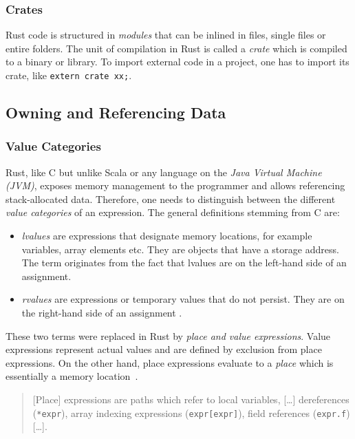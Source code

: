 \subsubsection{Crates}

Rust code is structured in \emph{modules} that can be inlined in files, single
files or entire folders. The unit of compilation in Rust is called a
\emph{crate} which is compiled to a binary or library. To import external code
in a project, one has to import its crate, like \lstinline!extern crate xx;!.

\subsection{Owning and Referencing Data}

\subsubsection{Value Categories}

Rust, like C but unlike Scala or any language on the \emph{Java Virtual Machine
(JVM)}, exposes memory management to the programmer and allows referencing
stack-allocated data. Therefore, one needs to distinguish between the different
\emph{value categories} of an expression. The general definitions stemming from
C are:

\begin{itemize}
\tightlist
\item
  \emph{lvalues} are expressions that designate memory locations, for
  example variables, array elements etc. They are objects that have a
  storage address. The term originates from the fact that lvalues are on
  the left-hand side of an assignment.
\item
  \emph{rvalues} are expressions or temporary values that do not
  persist. They are on the right-hand side of an assignment \cite{wiki:lvalues}.
\end{itemize}

These two terms were replaced in Rust by \emph{place and value expressions}.
Value expressions represent actual values and are defined by exclusion from
place expressions. On the other hand, place expressions evaluate to a
\emph{place} which is essentially a memory location~\cite{rustref}.

\begin{quote}
{[}Place{]} expressions are paths which refer to local variables,
{[}\ldots{]} dereferences (\passthrough{\lstinline!*expr!}), array
indexing expressions (\passthrough{\lstinline!expr[expr]!}), field
references (\passthrough{\lstinline!expr.f!}) {[}\ldots{]}. \\
\cite[section ``Expressions'']{rustref}
\end{quote}

